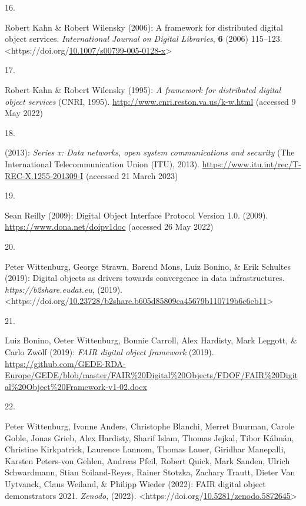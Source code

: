 \begin{thebibliography}{9}
\hypertarget{ref-kahnFrameworkDistributedDigital2006b}{}
16.

Robert Kahn \& Robert Wilensky (2006): A framework for distributed
digital object services. \emph{International Journal on Digital
Libraries}, \textbf{6} (2006) 115--123.
\textless https://doi.org/\href{https://doi.org/10.1007/s00799-005-0128-x}{10.1007/s00799-005-0128-x}\textgreater{}

\hypertarget{ref-kahnFrameworkDistributedDigital1995a}{}
17.

Robert Kahn \& Robert Wilensky (1995): \emph{A framework for distributed
digital object services} ({CNRI}, 1995).
\url{http://www.cnri.reston.va.us/k-w.html} (accessed 9 May 2022)

\hypertarget{ref-x1255FrameworkDiscovery}{}
18.

(2013): \emph{Series x: Data networks, open system communications and
security} ({The International Telecommunication Union (ITU)}, 2013).
\url{https://www.itu.int/rec/T-REC-X.1255-201309-I} (accessed 21 March
2023)

\hypertarget{ref-DigitalObjectInterface}{}
19.

Sean Reilly (2009): Digital {Object Interface Protocol Version} 1.0.
(2009). \url{https://www.dona.net/doipv1doc} (accessed 26 May 2022)

\hypertarget{ref-wittenburgDigitalObjectsDrivers2019a}{}
20.

Peter Wittenburg, George Strawn, Barend Mons, Luiz Bonino, \& Erik
Schultes (2019): Digital objects as drivers towards convergence in data
infrastructures. \emph{https://b2share.eudat.eu}, (2019).
\textless https://doi.org/\href{https://doi.org/10.23728/b2share.b605d85809ca45679b110719b6c6cb11}{10.23728/b2share.b605d85809ca45679b110719b6c6cb11}\textgreater{}

\hypertarget{ref-boninoFAIRDigitalObject}{}
21.

Luiz Bonino, Oeter Wittenburg, Bonnie Carroll, Alex Hardisty, Mark
Leggott, \& Carlo Zwölf (2019): \emph{{FAIR} digital object framework}
(2019).
\url{https://github.com/GEDE-RDA-Europe/GEDE/blob/master/FAIR\%20Digital\%20Objects/FDOF/FAIR\%20Digital\%20Object\%20Framework-v1-02.docx}

\hypertarget{ref-wittenburgFAIRDigitalObject2022b}{}
22.

Peter Wittenburg, Ivonne Anders, Christophe Blanchi, Merret Buurman,
Carole Goble, Jonas Grieb, Alex Hardisty, Sharif Islam, Thomas Jejkal,
Tibor Kálmán, Christine Kirkpatrick, Laurence Lannom, Thomas Lauer,
Giridhar Manepalli, Karsten Peters-von Gehlen, Andreas Pfeil, Robert
Quick, Mark Sanden, Ulrich Schwardmann, Stian Soiland-Reyes, Rainer
Stotzka, Zachary Trautt, Dieter Van Uytvanck, Claus Weiland, \& Philipp
Wieder (2022): {FAIR} digital object demonstrators 2021. \emph{Zenodo},
(2022).
\textless https://doi.org/\href{https://doi.org/10.5281/zenodo.5872645}{10.5281/zenodo.5872645}\textgreater{}


\end{thebibliography}
